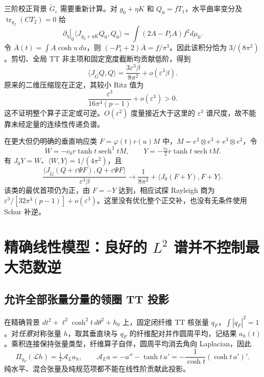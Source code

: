 \documentclass[UTF8,fontset=fandol,zihao=-4,oneside,openany]{ctexbook}
\theoremstyle{cjkplain}
\numberwithin{equation}{chapter}
\begin{document}
三阶校正背景 $\widetilde G_\varepsilon$ 需要重新计算。对 $g_0+\eta K$ 和 $Q_0=fT_1$，水平曲率变分及 $\operatorname{tr}_{g_2}(CT_2)=0$ 给
\[
 \left.\partial_\eta\right|_0\langle J_{g_0+\eta K}Q_0,Q_0\rangle
 =\int(2A-P_tA)f^2d\mu_0.
\]
令 $\overline A(t)=\int A\cosh u\,du$，则
$(-P_t+2)\overline A=f/\pi^3$。因此该积分恰为 $3/(8\pi^2)$。剪切、全局 TT 非主项和固定宽度截断均贡献低阶，得到
\[
 \langle J_{\widetilde G}Q,Q\rangle
 =\frac{3\varepsilon^3\beta}{8\pi^2}+o(\varepsilon^3\beta).
\]
原来的二维压缩现在正定，其较小 Ritz 值为
\begin{equation}
 \frac{\varepsilon^3}{16\pi^4(p-1)}+o(\varepsilon^3)>0.
 \label{BUN:corrected-ritz}
\end{equation}
这不证明整个算子正定或可逆。$O(\varepsilon^2)$ 度量接近大于这里的 $\varepsilon^3$ 谱尺度，故不能靠未经定量的连续性传递负谱。

在更大但仍明确的垂直响应类 $F=\varphi(t)r(u)M$ 中，$M=e^2\otimes e^3+e^3\otimes e^2$，令
\[
 W=-c_0r\tanh t\operatorname{sech}^3tM,
 \qquad Y=-\tfrac{c_0}{2}r\tanh t\operatorname{sech}tM.
\]
有 $J_0Y=W$、$\langle W,Y\rangle=1/(4\pi^2)$，且
\[
 \frac{\langle J_{\widetilde G}(Q+\varepsilon\Psi F),Q+\varepsilon\Psi F\rangle}
 {\varepsilon^3\beta}
 \longrightarrow\frac1{8\pi^2}+\langle J_0(F+Y),F+Y\rangle.
\]
该类的最优首项仍为正，由 $F=-Y$ 达到，相应试探 Rayleigh 商为
$\varepsilon^3/[32\pi^4(p-1)]+o(\varepsilon^3)$。这里没有优化整个正交补，也没有无条件使用 Schur 补逆。

\section{精确线性模型：良好的 \texorpdfstring{$L^2$}{L²} 谱并不控制最大范数逆}
\label{BUN:inverse}

\subsection{允许全部张量分量的领圈 TT 投影}
在精确背景
$dt^2+\ell^2\cosh^2t\,d\theta^2+h_0$ 上，固定闭纤维 TT 核张量 $q_F$，$\int|q_F|^2=1$。对\emph{任意}对称张量 $h$，取其垂直块与 $q_F$ 的纤维配对并作圆周平均，记结果 $a_h(t)$。乘积连接保持张量类型，纤维算子自伴，圆周平均消去角向 Laplacian，因此
\begin{equation}
 \Pi_{q_F}(\mathcal Lh)=\tfrac12\mathcal A_La_h,
 \qquad\mathcal A_La=-a''-\tanh t\,a'
 =-\frac1{\cosh t}(\cosh t\,a')'.
 \label{BUN:tt-projection}
\end{equation}
纯水平、混合张量及纯规范项都不能在线性阶贡献此投影。
\end{document}
